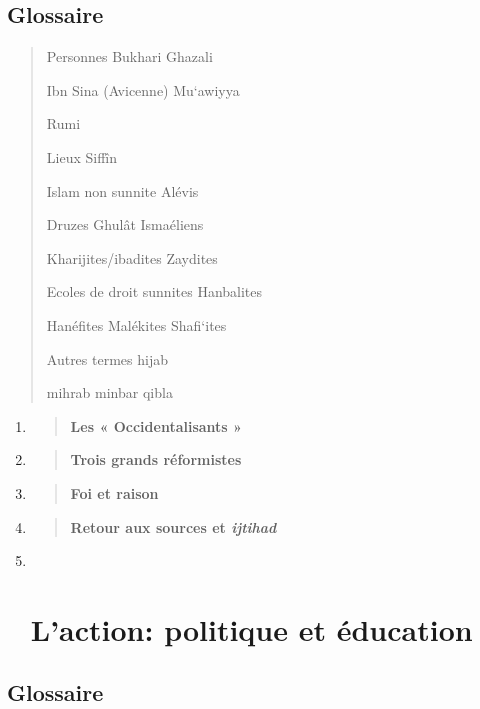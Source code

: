 \hypertarget{glossaire}{%
\subsection{\texorpdfstring{{Glossaire}}{Glossaire}}\label{glossaire}}

\begin{quote}
{Personnes} Bukhari Ghazali

Ibn Sina (Avicenne) Mu`awiyya

Rumi

{Lieux} Siffîn

{Islam non sunnite} Alévis

Druzes Ghulât Ismaéliens

Kharijites/ibadites Zaydites

{Ecoles de droit sunnites} Hanbalites

Hanéfites Malékites Shafi`ites

{Autres termes} hijab

mihrab minbar qibla

 
\end{quote}


\begin{enumerate}
\def\labelenumi{\Roman{enumi}.}
\item
  \begin{quote}
  \textbf{Les « Occidentalisants »}
  \end{quote}
\item
  \begin{quote}
  \textbf{Trois grands réformistes}
  \end{quote}
\item
  \begin{quote}
  \textbf{Foi et raison}
  \end{quote}
\item
  \begin{quote}
  \textbf{Retour aux sources et \emph{ijtihad}}
  \end{quote}
\item ~
  \hypertarget{laction-politique-et-uxe9ducation}{%
  \section{L'action: politique et
  éducation}\label{laction-politique-et-uxe9ducation}}
\end{enumerate}

\hypertarget{glossaire-2}{%
\subsection{\texorpdfstring{{Glossaire}}{Glossaire}}\label{glossaire-2}}

